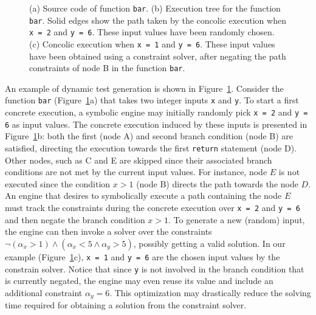 \begin{figure}[t]
\begin{subfigure}{.33\textwidth}
    \caption{}
  \end{subfigure}
  \caption{(a) Source code of function {\tt bar}. (b) Execution tree for the function {\tt bar}. Solid edges show the path taken by the concolic execution when {\tt x = 2} and {\tt y = 6}. These input values have been randomly chosen. (c) Concolic execution when {\tt x = 1} and {\tt y = 6}. These input values have been obtained using a constraint solver, after negating the path constraints of node B in the function {\tt bar}.}
  \label{fig:example-concrete-execution}
  \vspace{-3mm}
\end{figure}

An example of dynamic test generation is shown in Figure~\ref{fig:example-concrete-execution}. Consider the function {\tt bar} (Figure~\ref{fig:example-concrete-execution}a) that takes two integer inputs {\tt x} and {\tt y}. To start a first concrete execution, a symbolic engine may initially randomly pick {\tt x = 2} and {\tt y = 6} as input values. The concrete execution induced by these inputs is presented in Figure~\ref{fig:example-concrete-execution}b: both the first (node A) and second branch condition (node B) are satisfied, directing the execution towards the first {\tt return} statement (node D). Other nodes, such as C and E are skipped since their associated branch conditions are not met by the current input values. For instance, node $E$ is not executed since the condition $x > 1$ (node B) directs the path towards the node $D$. An engine that desires to symbolically execute a path containing the node $E$ must track the constraints during the concrete execution over {\tt x = 2} and {\tt y = 6} and then negate the branch condition $x > 1$. To generate a new (random) input, the engine can then invoke a solver over the constraints $\neg(\alpha_x > 1) \wedge (\alpha_x < 5 \wedge \alpha_y > 5)$, possibly getting a valid solution. In our example (Figure~\ref{fig:example-concrete-execution}c), {\tt x = 1} and {\tt y = 6} are the chosen input values by the constrain solver. Notice that since {\tt y} is not involved in the branch condition that is currently negated, the engine may even reuse its value and include an additional constraint $\alpha_y = 6$. This optimization may drastically reduce the solving time required for obtaining a solution from the constraint solver.

